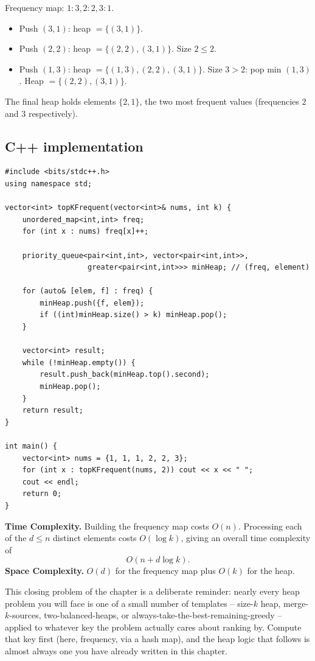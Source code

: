 Frequency map: $1{:}3, 2{:}2, 3{:}1$.

\begin{itemize}
  \item Push $(3,1)$: heap $=\{(3,1)\}$.
  \item Push $(2,2)$: heap $=\{(2,2),(3,1)\}$. Size $2 \le 2$.
  \item Push $(1,3)$: heap $=\{(1,3),(2,2),(3,1)\}$. Size $3>2$: pop min
        $(1,3)$. Heap $=\{(2,2),(3,1)\}$.
\end{itemize}

The final heap holds elements $\{2, 1\}$, the two most frequent values
(frequencies $2$ and $3$ respectively).

\subsection*{C++ implementation}

\begin{lstlisting}
#include <bits/stdc++.h>
using namespace std;

vector<int> topKFrequent(vector<int>& nums, int k) {
    unordered_map<int,int> freq;
    for (int x : nums) freq[x]++;

    priority_queue<pair<int,int>, vector<pair<int,int>>,
                   greater<pair<int,int>>> minHeap; // (freq, element)

    for (auto& [elem, f] : freq) {
        minHeap.push({f, elem});
        if ((int)minHeap.size() > k) minHeap.pop();
    }

    vector<int> result;
    while (!minHeap.empty()) {
        result.push_back(minHeap.top().second);
        minHeap.pop();
    }
    return result;
}

int main() {
    vector<int> nums = {1, 1, 1, 2, 2, 3};
    for (int x : topKFrequent(nums, 2)) cout << x << " ";
    cout << endl;
    return 0;
}
\end{lstlisting}

\begin{complexitybox}
\textbf{Time Complexity.} Building the frequency map costs $O(n)$.
Processing each of the $d \le n$ distinct elements costs $O(\log k)$,
giving an overall time complexity of
\[
  O(n + d \log k).
\]
\textbf{Space Complexity.} $O(d)$ for the frequency map plus $O(k)$ for
the heap.
\end{complexitybox}

\begin{takeawaybox}
This closing problem of the chapter is a deliberate reminder: nearly
every heap problem you will face is one of a small number of templates --
size-$k$ heap, merge-$k$-sources, two-balanced-heaps, or
always-take-the-best-remaining-greedy -- applied to whatever key the
problem actually cares about ranking by. Compute that key first (here,
frequency, via a hash map), and the heap logic that follows is almost
always one you have already written in this chapter.
\end{takeawaybox}
